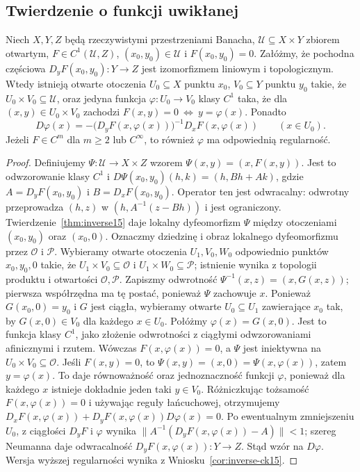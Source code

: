 \subsection{Twierdzenie o funkcji uwikłanej}

\begin{twierdzenie}
\label{thm:implicit15}
Niech $X,Y,Z$ będą rzeczywistymi przestrzeniami Banacha, $\mathcal U\subseteq X\times Y$ zbiorem otwartym, $F\in C^1(\mathcal U,Z)$, $(x_0,y_0)\in\mathcal U$ i $F(x_0,y_0)=0$. Załóżmy, że pochodna częściowa $D_yF(x_0,y_0):Y\to Z$ jest izomorfizmem liniowym i topologicznym. Wtedy istnieją otwarte otoczenia $U_0\subseteq X$ punktu $x_0$, $V_0\subseteq Y$ punktu $y_0$ takie, że $U_0\times V_0\subseteq\mathcal U$, oraz jedyna funkcja $\varphi:U_0\to V_0$ klasy $C^1$ taka, że dla $(x,y)\in U_0\times V_0$ zachodzi
$F(x,y)=0\ \Longleftrightarrow\ y=\varphi(x)$. Ponadto
\[
D\varphi(x)=-\bigl(D_yF(x,\varphi(x))\bigr)^{-1}D_xF(x,\varphi(x))\qquad(x\in U_0).
\]
Jeżeli $F\in C^m$ dla $m\ge2$ lub $C^\infty$, to również $\varphi$ ma odpowiednią regularność.
\end{twierdzenie}
\begin{proof}
Definiujemy $\Psi:\mathcal U\to X\times Z$ wzorem $\Psi(x,y)=(x,F(x,y))$. Jest to odwzorowanie klasy $C^1$ i
$D\Psi(x_0,y_0)(h,k)=(h,Bh+Ak)$, gdzie $A=D_yF(x_0,y_0)$ i $B=D_xF(x_0,y_0)$. Operator ten jest odwracalny: odwrotny przeprowadza $(h,z)$ w $(h,A^{-1}(z-Bh))$ i jest ograniczony. Twierdzenie~\ref{thm:inverse15} daje lokalny dyfeomorfizm $\Psi$ między otoczeniami $(x_0,y_0)$ oraz $(x_0,0)$. Oznaczmy dziedzinę i obraz lokalnego dyfeomorfizmu przez $\mathcal O$ i $\mathcal P$. Wybieramy otwarte otoczenia $U_1,V_0,W_0$ odpowiednio punktów $x_0,y_0,0$ takie, że $U_1\times V_0\subseteq\mathcal O$ i $U_1\times W_0\subseteq\mathcal P$; istnienie wynika z topologii produktu i otwartości $\mathcal O,\mathcal P$. Zapiszmy odwrotność $\Psi^{-1}(x,z)=(x,G(x,z))$; pierwsza współrzędna ma tę postać, ponieważ $\Psi$ zachowuje $x$. Ponieważ $G(x_0,0)=y_0$ i $G$ jest ciągła, wybieramy otwarte $U_0\subseteq U_1$ zawierające $x_0$ tak, by $G(x,0)\in V_0$ dla każdego $x\in U_0$. Połóżmy $\varphi(x)=G(x,0)$. Jest to funkcja klasy $C^1$, jako złożenie odwrotności z ciągłymi odwzorowaniami afinicznymi i rzutem. Wówczas $F(x,\varphi(x))=0$, a $\Psi$ jest iniektywna na $U_0\times V_0\subseteq\mathcal O$. Jeśli $F(x,y)=0$, to $\Psi(x,y)=(x,0)=\Psi(x,\varphi(x))$, zatem $y=\varphi(x)$. To daje równoważność oraz jednoznaczność funkcji $\varphi$, ponieważ dla każdego $x$ istnieje dokładnie jeden taki $y\in V_0$. Różniczkując tożsamość $F(x,\varphi(x))=0$ i używając reguły łańcuchowej, otrzymujemy
$D_xF(x,\varphi(x))+D_yF(x,\varphi(x))D\varphi(x)=0$.
Po ewentualnym zmniejszeniu $U_0$, z ciągłości $D_yF$ i $\varphi$ wynika $\|A^{-1}(D_yF(x,\varphi(x))-A)\|<1$; szereg Neumanna daje odwracalność $D_yF(x,\varphi(x)):Y\to Z$. Stąd wzór na $D\varphi$. Wersja wyższej regularności wynika z Wniosku~\ref{cor:inverse-ck15}.
\end{proof}

